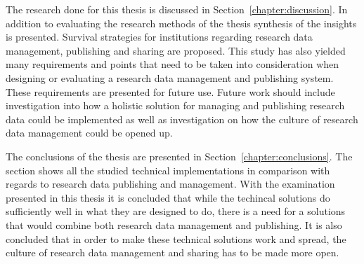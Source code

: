 The research done for this thesis is discussed in Section~\ref{chapter:discussion}.
In addition to evaluating the research methods of the thesis
synthesis of the insights is presented. Survival strategies for institutions regarding research data
management, publishing and sharing are proposed. This study has also yielded many requirements and points
that need to be taken into consideration when designing or evaluating a
research data management and publishing system. These requirements are
presented for future use. Future work should include investigation into how a
holistic solution for managing and publishing research data could be
implemented as well as investigation on how the culture of research data
management could be opened up.

The conclusions of the thesis are presented in Section~\ref{chapter:conclusions}. The section shows all the studied technical
implementations in comparison with regards to research data publishing
and management. With the examination presented in this thesis it is
concluded that while the techincal solutions do sufficiently well in what they are designed to
do, there is a need for a solutions that would combine both research data
management and publishing. It is also concluded that in order to make these
technical solutions work and spread, the culture of research data management and sharing
has to be made more open.

\iffalse
This is the introduction chapter - it will contain the following things.

\begin{itemize}
    \item general introduction to the subject
    \item general background
    \item objectives for the maste'r thesis
    \item the main research question - how to share research data?
    \begin{itemize}
        \item how to do it?
        \item how is it being done at the moment=
    \end{itemize}
    \item subproblems
    \begin{itemize}
        \item technical
        \item cultural
        \item organizational
    \end{itemize}
    \item what this thesis covers and what it does not cover
    \item positioning the work and how it's connected to other work
    \item important concepts
    \item the structure of the thesis
\end{itemize}
\fi
